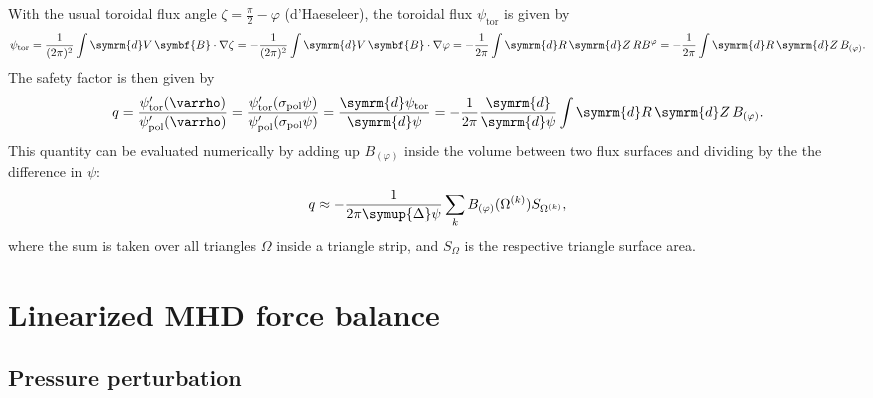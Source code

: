 \documentclass[a4paper, 10pt, english]{article}
\let\temp\varrho
\let\varrho\rho
\let\rho\temp
\let\temp\vartheta
\let\vartheta\theta
\let\theta\temp
\let\temp\varphi
\let\varphi\phi
\let\phi\temp
\let\vec\symbf
\newcommand*\diff{\ensuremath{\symrm{d}}}  %
\newcommand*\td[2][]{\ensuremath{\frac{\diff #1}{\diff #2}}}  %
\newcommand*\pol{\ensuremath{\textrm{pol}}}  %
\newcommand*\tor{\ensuremath{\textrm{tor}}}  %
\begin{document}
With the usual toroidal flux angle $\zeta = \frac{\pi}{2} - \phi$ (d'Haeseleer), the toroidal flux $\psi_{\tor}$ is given by
\begin{gather}
  \psi_{\tor} = \frac{1}{(2 \pi)^{2}} \int \diff V \, \vec{B} \cdot \nabla \zeta = -\frac{1}{(2 \pi)^{2}} \int \diff V \, \vec{B} \cdot \nabla \phi = -\frac{1}{2 \pi} \int \diff R \, \diff Z \, R B^{\phi} = -\frac{1}{2 \pi} \int \diff R \, \diff Z \, B_{(\phi)}.
\end{gather}
The safety factor is then given by
\begin{gather*}
  q = \frac{\psi_{\tor}' (\rho)}{\psi_{\pol}' (\rho)} = \frac{\psi_{\tor}' (\sigma_{\pol} \psi)}{\psi_{\pol}' (\sigma_{\pol} \psi)} = \td[\psi_{\tor}]{\psi} = -\frac{1}{2 \pi} \td{\psi} \int \diff R \, \diff Z \, B_{(\phi)}.
\end{gather*}
This quantity can be evaluated numerically by adding up $B_{(\phi)}$ inside the volume between two flux surfaces and dividing by the the difference in $\psi$:
\begin{gather}
  q \approx -\frac{1}{2 \pi \symup{\Delta} \psi} \sum_{k} B_{(\phi)} (\Omega^{(k)}) S_{\Omega^{(k)}},
\end{gather}
where the sum is taken over all triangles $\Omega$ inside a triangle strip, and $S_{\Omega}$ is the respective triangle surface area.

\section{Linearized MHD force balance}

\subsection{Pressure perturbation}
\end{document}
